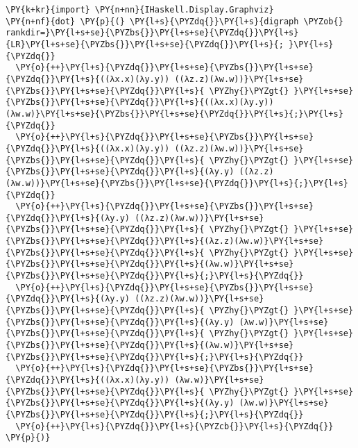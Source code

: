     \begin{tcolorbox}[breakable, size=fbox, boxrule=1pt, pad at break*=1mm,colback=cellbackground, colframe=cellborder, top=.75ex]
\begin{Verbatim}[commandchars=\\\{\}]
\PY{k+kr}{import} \PY{n+nn}{IHaskell.Display.Graphviz}
\PY{n+nf}{dot} \PY{p}{(} \PY{l+s}{\PYZdq{}}\PY{l+s}{digraph \PYZob{} rankdir=}\PY{l+s+se}{\PYZbs{}}\PY{l+s+se}{\PYZdq{}}\PY{l+s}{LR}\PY{l+s+se}{\PYZbs{}}\PY{l+s+se}{\PYZdq{}}\PY{l+s}{; }\PY{l+s}{\PYZdq{}}
  \PY{o}{++}\PY{l+s}{\PYZdq{}}\PY{l+s+se}{\PYZbs{}}\PY{l+s+se}{\PYZdq{}}\PY{l+s}{((λx.x)(λy.y)) ((λz.z)(λw.w))}\PY{l+s+se}{\PYZbs{}}\PY{l+s+se}{\PYZdq{}}\PY{l+s}{ \PYZhy{}\PYZgt{} }\PY{l+s+se}{\PYZbs{}}\PY{l+s+se}{\PYZdq{}}\PY{l+s}{((λx.x)(λy.y)) (λw.w)}\PY{l+s+se}{\PYZbs{}}\PY{l+s+se}{\PYZdq{}}\PY{l+s}{;}\PY{l+s}{\PYZdq{}}
  \PY{o}{++}\PY{l+s}{\PYZdq{}}\PY{l+s+se}{\PYZbs{}}\PY{l+s+se}{\PYZdq{}}\PY{l+s}{((λx.x)(λy.y)) ((λz.z)(λw.w))}\PY{l+s+se}{\PYZbs{}}\PY{l+s+se}{\PYZdq{}}\PY{l+s}{ \PYZhy{}\PYZgt{} }\PY{l+s+se}{\PYZbs{}}\PY{l+s+se}{\PYZdq{}}\PY{l+s}{(λy.y) ((λz.z)(λw.w))}\PY{l+s+se}{\PYZbs{}}\PY{l+s+se}{\PYZdq{}}\PY{l+s}{;}\PY{l+s}{\PYZdq{}}
  \PY{o}{++}\PY{l+s}{\PYZdq{}}\PY{l+s+se}{\PYZbs{}}\PY{l+s+se}{\PYZdq{}}\PY{l+s}{(λy.y) ((λz.z)(λw.w))}\PY{l+s+se}{\PYZbs{}}\PY{l+s+se}{\PYZdq{}}\PY{l+s}{ \PYZhy{}\PYZgt{} }\PY{l+s+se}{\PYZbs{}}\PY{l+s+se}{\PYZdq{}}\PY{l+s}{(λz.z)(λw.w)}\PY{l+s+se}{\PYZbs{}}\PY{l+s+se}{\PYZdq{}}\PY{l+s}{ \PYZhy{}\PYZgt{} }\PY{l+s+se}{\PYZbs{}}\PY{l+s+se}{\PYZdq{}}\PY{l+s}{(λw.w)}\PY{l+s+se}{\PYZbs{}}\PY{l+s+se}{\PYZdq{}}\PY{l+s}{;}\PY{l+s}{\PYZdq{}}
  \PY{o}{++}\PY{l+s}{\PYZdq{}}\PY{l+s+se}{\PYZbs{}}\PY{l+s+se}{\PYZdq{}}\PY{l+s}{(λy.y) ((λz.z)(λw.w))}\PY{l+s+se}{\PYZbs{}}\PY{l+s+se}{\PYZdq{}}\PY{l+s}{ \PYZhy{}\PYZgt{} }\PY{l+s+se}{\PYZbs{}}\PY{l+s+se}{\PYZdq{}}\PY{l+s}{(λy.y) (λw.w)}\PY{l+s+se}{\PYZbs{}}\PY{l+s+se}{\PYZdq{}}\PY{l+s}{ \PYZhy{}\PYZgt{} }\PY{l+s+se}{\PYZbs{}}\PY{l+s+se}{\PYZdq{}}\PY{l+s}{(λw.w)}\PY{l+s+se}{\PYZbs{}}\PY{l+s+se}{\PYZdq{}}\PY{l+s}{;}\PY{l+s}{\PYZdq{}}
  \PY{o}{++}\PY{l+s}{\PYZdq{}}\PY{l+s+se}{\PYZbs{}}\PY{l+s+se}{\PYZdq{}}\PY{l+s}{((λx.x)(λy.y)) (λw.w)}\PY{l+s+se}{\PYZbs{}}\PY{l+s+se}{\PYZdq{}}\PY{l+s}{ \PYZhy{}\PYZgt{} }\PY{l+s+se}{\PYZbs{}}\PY{l+s+se}{\PYZdq{}}\PY{l+s}{(λy.y) (λw.w)}\PY{l+s+se}{\PYZbs{}}\PY{l+s+se}{\PYZdq{}}\PY{l+s}{;}\PY{l+s}{\PYZdq{}}
  \PY{o}{++}\PY{l+s}{\PYZdq{}}\PY{l+s}{\PYZcb{}}\PY{l+s}{\PYZdq{}} \PY{p}{)}
\end{Verbatim}
\end{tcolorbox}

